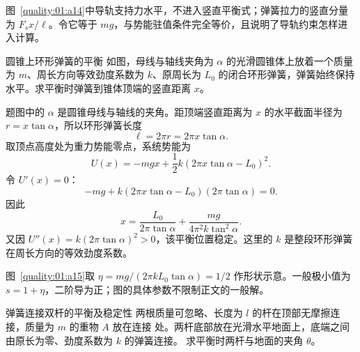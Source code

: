 {\begin{xesolution}

图~\ref{quality:01:a14}中导轨支持力水平，不进入竖直平衡式；弹簧拉力的竖直分量为 $F_s x/\ell$。令它等于 $mg$，与势能驻值条件完全等价，且说明了导轨约束怎样进入计算。
\end{xesolution}

\begin{origexamplebox}{圆锥上环形弹簧的平衡}\label{ch01:ex:s14-1-11}
如图，母线与轴线夹角为 $\alpha$ 的光滑圆锥体上放着一个质量为 $m$、周长方向等效劲度系数为 $k$、原周长为
$L_0$ 的闭合环形弹簧，弹簧始终保持水平。求平衡时弹簧到锥体顶端的竖直距离 $x$。
\end{origexamplebox}

\begin{xesolution}
题图中的 $\alpha$ 是圆锥母线与轴线的夹角。距顶端竖直距离为 $x$ 的水平截面半径为
$r=x\tan\alpha$，所以环形弹簧长度
\[
 \ell=2\pi r=2\pi x\tan\alpha.
\]
取顶点高度处为重力势能零点，系统势能为
\[
 U(x)=-mgx+\frac12k(2\pi x\tan\alpha-L_0)^2.
\]
令 $U'(x)=0$：
\[
 -mg+k(2\pi x\tan\alpha-L_0)(2\pi\tan\alpha)=0.
\]
因此
\[
 \boxed{x=\frac{L_0}{2\pi\tan\alpha}
 +\frac{mg}{4\pi^2k\tan^2\alpha}}.
\]
又因
$U''(x)=k(2\pi\tan\alpha)^2>0$，该平衡位置稳定。这里的 $k$ 是整段环形弹簧在周长方向的等效劲度系数。


图~\ref{quality:01:a15}取 $\eta=mg/(2\pi kL_0\tan\alpha)=1/2$ 作形状示意。一般极小值为 $s=1+\eta$，二阶导为正；图的具体参数不限制正文的一般解。
\end{xesolution}

\begin{origexamplebox}{弹簧连接双杆的平衡及稳定性}\label{ch01:ex:s14-1-12}
两根质量可忽略、长度为 $l$ 的杆在顶部无摩擦连接，质量为 $m$ 的重物 $A$ 放在连接
处。两杆底部放在光滑水平地面上，底端之间由原长为零、劲度系数为 $k$ 的弹簧连接。
求平衡时两杆与地面的夹角 $\theta$。
\end{origexamplebox}

}
